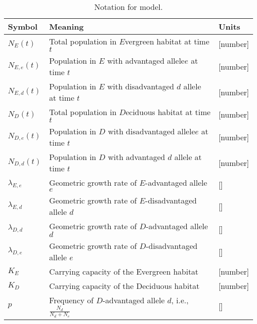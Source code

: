 \documentclass[11pt, reqno]{amsart}
\begin{document}
\begin{spacing}{1}
\begin{table}
  \renewcommand*\arraystretch{.9}
  \caption{Notation for model.}\label{T:one}
  \centering
  \begin{tabular} {@{}lp{}l@{}}
    \toprule
    Symbol &Meaning &Units\\     
    \midrule 
    $N_E(t)$ &Total population in $E$vergreen habitat at time $t$ &[number]\\    
    $N_{E,e}(t)$ &Population in $E$ with advantaged allele$e$ at time $t$ &[number]\\    
    $N_{E,d}(t)$ &Population in $E$ with disadvantaged $d$ allele at time $t$ &[number]\\    
   $N_D(t)$ &Total population in $D$eciduous habitat at time $t$ &[number]\\
    $N_{D,e}(t)$ &Population in $D$ with disadvantaged allele$e$ at time $t$ &[number]\\    
    $N_{D,d}(t)$ &Population in $D$ with advantaged $d$ allele at time $t$ &[number]\\    
   $\lambda_{E,e}$ &Geometric growth rate of $E$-advantaged allele $e$&[]\\
   $\lambda_{E,d}$ &Geometric growth rate of $E$-disadvantaged allele $d$&[]\\
   $\lambda_{D,d}$ &Geometric growth rate of $D$-advantaged allele $d$&[]\\
   $\lambda_{D,e}$ &Geometric growth rate of $D$-disadvantaged allele $e$&[]\\
   $K_E$ &Carrying capacity of the Evergreen habitat&[number]\\
   $K_D$ &Carrying capacity of the Deciduous habitat&[number]\\
   $p$      & Frequency of $D$-advantaged allele $d$, i.e., $\frac{N_d}{N_d + N_e}$ &[]\\
    \bottomrule
  \end{tabular}
\end{table}

\end{spacing}
\end{document}
